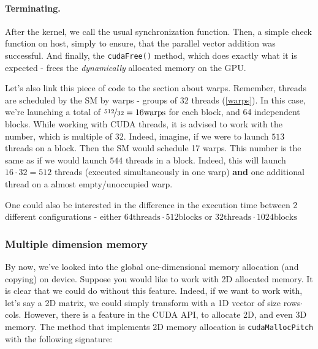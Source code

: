\documentclass[12pt]{article}
\begin{document}
\vspace{-0.8cm}
\paragraph{Terminating.} After the kernel, we call the usual synchronization function. 
Then, a simple check function on host, simply to ensure, that the parallel vector addition was successful.
And finally, the \verb|cudaFree()| method, which does exactly what it is expected - 
frees the \textit{dynamically} allocated memory on the GPU.

Let's also link this piece of code to the section about warps. Remember, 
threads are scheduled by the SM by warps - groups of 32 threads (\autoref{warps}). 
In this case, we're launching a total of $\nicefrac{512}{32} = 16 \text{warps}$ for each 
block, and 64 independent blocks. While working with CUDA threads, it is advised to work with 
the number, which is multiple of $32$. Indeed, imagine, if we were to launch $513$ threads on a block.
Then the SM would schedule 17 warps. This number is the same as if we would launch $544$ threads in a block.
Indeed, this will launch $16\cdot 32 = 512$ threads (executed simultaneously in one warp) \textbf{and} 
one additional thread on a almost empty/unoccupied warp. 

One could also be interested in the difference in the execution time between 2 different
 configurations - either $64\text{threads}\cdot 512\text{blocks}$ or $32\text{threads}\cdot 1024\text{blocks}$

\subsubsection{Multiple dimension memory}
By now, we've looked into the global one-dimensional 
memory allocation (and copying) on device. Suppose you would like to work 
with 2D allocated memory. It is clear that we could do without this feature. 
Indeed, if we want to work with, let's say a 2D matrix, we could simply 
transform with a 1D vector of size rows$\cdot$cols.
However, there is a feature in the CUDA API, to allocate 2D, and even 
3D memory. 
\newpage
The method that implements 2D memory allocation is \verb|cudaMallocPitch| with the following signature:
\end{document}

